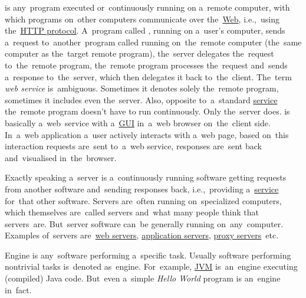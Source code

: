 \label{webserviceapplication}
\begin{itemize}
     is any~program executed or~continuously running on a~remote computer, with which programs on~other computers communicate over the~\hyperref[internetweb]{Web}, i.e.,~using the~\hyperref[http]{HTTP protocol}.
            A~program called \hyperref[clientserverarchitecture]{}, running on a~user's computer, sends a~request to~another~program called \hyperref[clientserverarchitecture]{} running on~the~remote computer (the~same computer as the~target remote program), the~server delegates the~request to~the~remote program, the~remote program processes the~request and~sends a~response to~the~server, which then delegates it back to~the~client.
            \warningnonl The~term \textit{web service} is~ambiguous.
            Sometimes it denotes solely the~remote program, sometimes it includes even the~server.
            Also, opposite to~a~standard \hyperref[applicationprocessprogramservicethread]{service} the~remote program doesn't have to run continuously.
            Only the~server does.
     is basically a~web~service with a~\hyperref[shellcligui]{GUI} in~a~web browser on~the~client side.
            In~a~web application a~user actively interacts with a~web page, based on~this interaction requests are~sent to~a~web service, responses are~sent back and~visualised in~the~browser.
\end{itemize}
\newpage

\label{server}
Exactly speaking a~server is a~continuously running software getting requests from another software and~sending responses back, i.e.,~providing a~\hyperref[applicationprocessprogramservicethread]{service} for~that other software.
Servers are~often running on~specialized computers, which themselves are~called servers and~what many people think that servers~are.
But~server software can~be generally running on~any~computer.
Examples of~servers are~\hyperref[webserver]{web servers}, \hyperref[applicationserver]{application servers}, \hyperref[proxy]{proxy servers}~etc.

\label{engine}
Engine is any~software performing a~specific task.
Usually software performing nontrivial tasks is~denoted as~engine.
For~example, \hyperref[jdkjrejvm]{JVM} is~an~engine executing (compiled) Java code.
But~even a~simple \textit{Hello World} program is an~engine in~fact.

